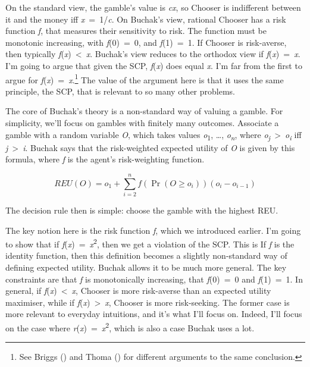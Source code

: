 \documentclass[
  11pt,
  letterpaper,
  DIV=11,
  numbers=noendperiod,
  twoside]{scrartcl}
\begin{document}
On the standard view, the gamble's value is \emph{cx}, so Chooser is
indifferent between it and the money iff \emph{x}~=~1/\emph{c}. On
Buchak's view, rational Chooser has a risk function \emph{f}, that
measures their sensitivity to risk. The function must be monotonic
increasing, with \emph{f}(0)~=~0, and \emph{f}(1)~=~1. If Chooser is
risk-averse, then typically \emph{f}(\emph{x})~\textless~\emph{x}.
Buchak's view reduces to the orthodox view if
\emph{f}(\emph{x})~=~\emph{x}. I'm going to argue that given the SCP,
\emph{f}(\emph{x}) does equal \emph{x}. I'm far from the first to argue
for \emph{f}(\emph{x})~=~\emph{x}.\footnote{See Briggs
  () and Thoma
  () for different arguments to the same
  conclusion.} The value of the argument here is that it uses the same
principle, the SCP, that is relevant to so many other problems.

The core of Buchak's theory is a non-standard way of valuing a gamble.
For simplicity, we'll focus on gambles with finitely many outcomes.
Associate a gamble with a random variable \emph{O}, which takes values
\emph{o}\textsubscript{1}, \ldots, \emph{o\textsubscript{n}}, where
\emph{o\textsubscript{j}}~\textgreater~\emph{o\textsubscript{i}} iff
\emph{j}~\textgreater~\emph{i}. Buchak says that the risk-weighted
expected utility of \emph{O} is given by this formula, where \emph{f} is
the agent's risk-weighting function.

\[
REU(O) = o_1 + \sum_{i = 2}^n f(\Pr(O \geq o_i))(o_i - o_{i-1})
\]

The decision rule then is simple: choose the gamble with the highest
REU.

The key notion here is the risk function \emph{f}, which we introduced
earlier. I'm going to show that if
\emph{f}(\emph{x})~=~\emph{x}\textsuperscript{2}, then we get a
violation of the SCP. This is If \emph{f} is the identity function, then
this definition becomes a slightly non-standard way of defining expected
utility. Buchak allows it to be much more general. The key constraints
are that \emph{f} is monotonically increasing, that \emph{f}(0)~=~0 and
\emph{f}(1)~=~1. In general, if \emph{f}(\emph{x})~\textless~\emph{x},
Chooser is more risk-averse than an expected utility maximiser, while if
\emph{f}(\emph{x})~\textgreater~\emph{x}, Chooser is more risk-seeking.
The former case is more relevant to everyday intuitions, and it's what
I'll focus on. Indeed, I'll focus on the case where
\emph{r}(\emph{x})~=~\emph{x}\textsuperscript{2}, which is also a case
Buchak uses a lot.
\end{document}
